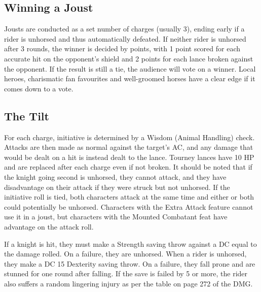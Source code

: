 \documentclass[10pt,a4paper,twoside,bg=print,twocolumn,openany,nodeprecatedcode]{dndbook}
\begin{document}
\subsection{Winning a Joust}
Jousts are conducted as a set number of charges (usually 3), ending early if a rider is unhorsed and thus automatically defeated. If neither rider is unhorsed after 3 rounds, the winner is decided by points, with 1 point scored for each accurate hit on the opponent's shield and 2 points for each lance broken against the opponent. If the result is still a tie, the audience will vote on a winner. Local heroes, charismatic fan favourites and well-groomed horses have a clear edge if it comes down to a vote.

\subsection{The Tilt}
For each charge, initiative is determined by a Wisdom (Animal Handling) check. Attacks are then made as normal against the target's AC, and any damage that would be dealt on a hit is instead dealt to the lance. Tourney lances have 10 HP and are replaced after each charge even if not broken. It should be noted that if the knight going second is unhorsed, they cannot attack, and they have disadvantage on their attack if they were struck but not unhorsed. If the initiative roll is tied, both characters attack at the same time and either or both could potentially be unhorsed. Characters with the Extra Attack feature cannot use it in a joust, but characters with the Mounted Combatant feat have advantage on the attack roll.

If a knight is hit, they must make a Strength saving throw against a DC equal to the damage rolled. On a failure, they are unhorsed. When a rider is unhorsed, they make a DC 15 Dexterity saving throw. On a failure, they fall prone and are stunned for one round after falling. If the save is failed by 5 or more, the rider also suffers a random lingering injury as per the table on page 272 of the DMG.
\end{document}
